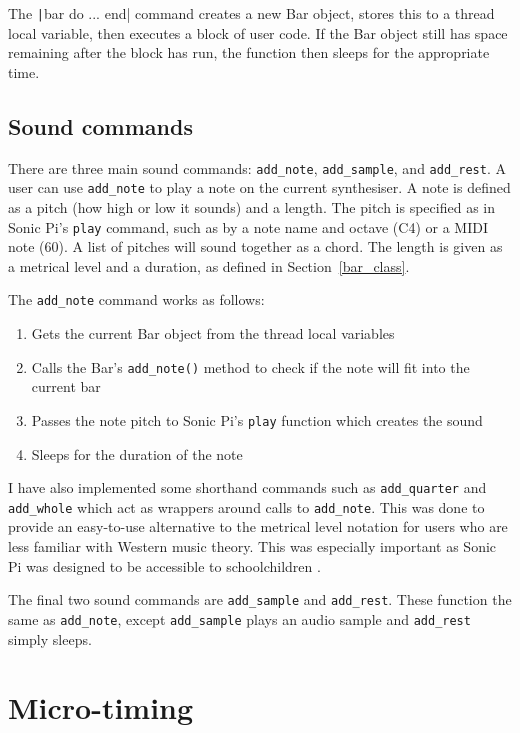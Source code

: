 \documentclass[12pt,twoside,openright]{report}
\begin{document}
The \texttt|bar do ... end| command creates a new Bar object, stores this to a
thread local variable, then executes a block of user code. If the Bar object
still has space remaining after the block has run, the function then sleeps for
the appropriate time.


\subsection{Sound commands} \label{sound_commands}

There are three main sound commands: \verb'add_note', \verb'add_sample', and \verb'add_rest'. A
user can use \verb'add_note' to play a note on the current synthesiser. A note is
defined as a pitch (how high or low it sounds) and a length. The pitch is
specified as in Sonic Pi's \verb'play' command, such as by a note name and octave (C4)
or a MIDI note (60). A list of pitches will sound together as a chord. The
length is given as a metrical level and a duration, as defined in Section~\ref{bar_class}.

The \verb'add_note' command works as follows:
\begin{enumerate}
    \item Gets the current Bar object from the thread local variables
    \item Calls the Bar's \verb'add_note()' method to check if the note will fit into the current bar
    \item Passes the note pitch to Sonic Pi's \verb'play' function which creates the sound
    \item Sleeps for the duration of the note
\end{enumerate}

I have also implemented some shorthand commands such as \verb'add_quarter' and
\verb'add_whole' which act as wrappers around calls to \verb'add_note'. This was done to
provide an easy-to-use alternative to the metrical level notation for users who
are less familiar with Western music theory. This was especially important as
Sonic Pi was designed to be accessible to schoolchildren \cite{aaron2013}.

The final two sound commands are \verb'add_sample' and \verb'add_rest'. These function the
same as \verb'add_note', except \verb'add_sample' plays an audio sample and \verb'add_rest' simply sleeps.



\section{Micro-timing} \label{micro-timing_implementation}
\end{document}

